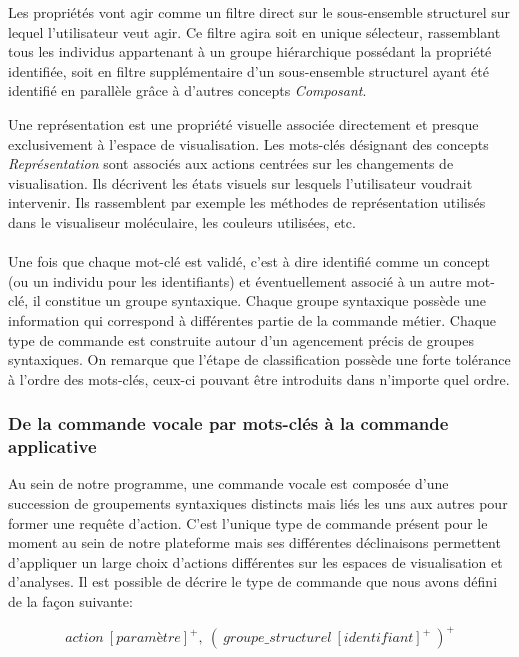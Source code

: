 Les propriétés vont agir comme un filtre direct sur le sous-ensemble structurel sur lequel l'utilisateur veut agir. Ce filtre agira soit en unique sélecteur, rassemblant tous les individus appartenant à un groupe hiérarchique possédant la propriété identifiée, soit en filtre supplémentaire d'un sous-ensemble structurel ayant été identifié en parallèle grâce à d'autres concepts \textit{Composant}.


Une représentation est une propriété visuelle associée directement et presque exclusivement à l'espace de visualisation. Les mots-clés désignant des concepts \textit{Représentation} sont associés aux actions centrées sur les changements de visualisation. Ils décrivent les états visuels sur lesquels l'utilisateur voudrait intervenir. Ils rassemblent par exemple les méthodes de représentation utilisés dans le visualiseur moléculaire, les couleurs utilisées, etc.
\\
\\
Une fois que chaque mot-clé est validé, c'est à dire identifié comme un concept (ou un individu pour les identifiants) et éventuellement associé à un autre mot-clé, il constitue un groupe syntaxique. Chaque groupe syntaxique possède une information qui correspond à différentes partie de la commande métier. Chaque type de commande est construite autour d'un agencement précis de groupes syntaxiques. On remarque que l'étape de classification possède une forte tolérance à l'ordre des mots-clés, ceux-ci pouvant être introduits dans n'importe quel ordre.


\subsubsection{De la commande vocale par mots-clés à la commande applicative} \label{command}

Au sein de notre programme, une commande vocale est composée d'une succession de groupements syntaxiques distincts mais liés les uns aux autres pour former une requête d'action. C'est l'unique type de commande présent pour le moment au sein de notre plateforme mais ses différentes déclinaisons permettent d'appliquer un large choix d'actions différentes sur les espaces de visualisation et d'analyses. Il est possible de décrire le type de commande que nous avons défini de la façon suivante:

$$action\ [paramètre]^+,\ (\ groupe\_structurel\ [identifiant]^+\ )^+$$

